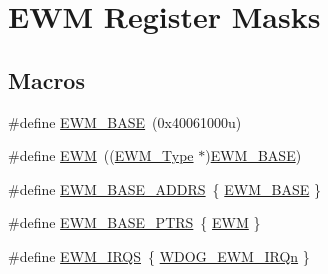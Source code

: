 \hypertarget{group___e_w_m___register___masks}{}\section{E\+WM Register Masks}
\label{group___e_w_m___register___masks}
\subsection*{Macros}
\begin{DoxyCompactItemize}
\item 
\#define \mbox{\hyperlink{group___e_w_m___register___masks_ga8609fc69000c45828e80571006c9c5c2}{E\+W\+M\+\_\+\+B\+A\+SE}}~(0x40061000u)
\item 
\#define \mbox{\hyperlink{group___e_w_m___register___masks_ga4c690a7633d3de9e8469adc23f784085}{E\+WM}}~((\mbox{\hyperlink{struct_e_w_m___type}{E\+W\+M\+\_\+\+Type}} $\ast$)\mbox{\hyperlink{group___e_w_m___register___masks_ga8609fc69000c45828e80571006c9c5c2}{E\+W\+M\+\_\+\+B\+A\+SE}})
\item 
\#define \mbox{\hyperlink{group___e_w_m___register___masks_ga1c3d806fd3948bbda5da2601cda208b4}{E\+W\+M\+\_\+\+B\+A\+S\+E\+\_\+\+A\+D\+D\+RS}}~\{ \mbox{\hyperlink{group___e_w_m___register___masks_ga8609fc69000c45828e80571006c9c5c2}{E\+W\+M\+\_\+\+B\+A\+SE}} \}
\item 
\#define \mbox{\hyperlink{group___e_w_m___register___masks_ga8b79ee9e363583bee6122ee3da7952b2}{E\+W\+M\+\_\+\+B\+A\+S\+E\+\_\+\+P\+T\+RS}}~\{ \mbox{\hyperlink{group___e_w_m___register___masks_ga4c690a7633d3de9e8469adc23f784085}{E\+WM}} \}
\item 
\#define \mbox{\hyperlink{group___e_w_m___register___masks_gac4f8bfcf7bfc6874ed0b321c67dd3111}{E\+W\+M\+\_\+\+I\+R\+QS}}~\{ \mbox{\hyperlink{group___interrupt__vector__numbers_gga666eb0caeb12ec0e281415592ae89083a0bff68ffa0f6a24e0103f156f26487b3}{W\+D\+O\+G\+\_\+\+E\+W\+M\+\_\+\+I\+R\+Qn}} \}
\end{DoxyCompactItemize}
